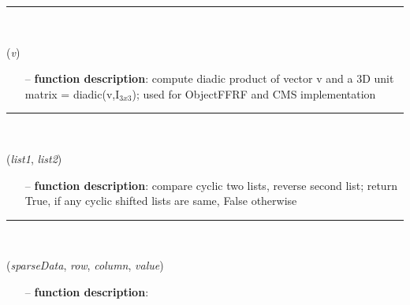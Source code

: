 \begin{itemize}[leftmargin=1.4cm]
\begin{itemize}[leftmargin=1.4cm]
\begin{itemize}[leftmargin=0.5cm]
\begin{itemize}[leftmargin=1.4cm]
\begin{itemize}[leftmargin=1.4cm]
\begin{itemize}[leftmargin=0.5cm]
\begin{itemize}[leftmargin=0.7cm]
\vspace{12pt}\end{itemize}
%
\noindent\rule{8cm}{0.75pt}\vspace{1pt} \\ 
\begin{flushleft}
\label{sec:FEM:VectorDiadicUnitMatrix3D}
({\it v})
\end{flushleft}
\setlength{\itemindent}{0.7cm}
\begin{itemize}[leftmargin=0.7cm]
\item[--]{\bf function description}: compute diadic product of vector v and a 3D unit matrix = diadic(v,I$_{3x3}$); used for ObjectFFRF and CMS implementation
\vspace{12pt}\end{itemize}
%
\noindent\rule{8cm}{0.75pt}\vspace{1pt} \\ 
\begin{flushleft}
\label{sec:FEM:CyclicCompareReversed}
({\it list1}, {\it list2})
\end{flushleft}
\setlength{\itemindent}{0.7cm}
\begin{itemize}[leftmargin=0.7cm]
\item[--]{\bf function description}: compare cyclic two lists, reverse second list; return True, if any cyclic shifted lists are same, False otherwise
\vspace{12pt}\end{itemize}
%
\noindent\rule{8cm}{0.75pt}\vspace{1pt} \\ 
\begin{flushleft}
\label{sec:FEM:AddEntryToCompressedRowSparseArray}
({\it sparseData}, {\it row}, {\it column}, {\it value})
\end{flushleft}
\setlength{\itemindent}{0.7cm}
\begin{itemize}[leftmargin=0.7cm]
\item[--]{\bf function description}: \vspace{-6pt}
\begin{itemize}[leftmargin=1.2cm]

\end{itemize}
\end{itemize}
\end{itemize}
\end{itemize}
\end{itemize}
\end{itemize}
\end{itemize}
\end{itemize}
